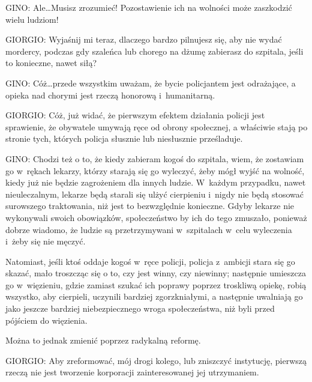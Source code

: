 \documentclass[oneside,polish,11pt,sfheadings]{mwbk}
\begin{document}
 
\noindent \noindent GINO: Ale\ldots Musisz zrozumieć! Pozostawienie ich na wolności może zaszkodzić wielu ludziom! 




 
\noindent GIORGIO: Wyjaśnij mi teraz, dlaczego bardzo pilnujesz się, aby nie wydać mordercy, podczas gdy szaleńca lub chorego na
dżumę zabierasz do szpitala, jeśli to konieczne, nawet siłą? 




 
\noindent \noindent GINO: Cóż\ldots przede wszystkim uważam, że bycie policjantem jest odrażające, a opieka nad chorymi jest rzeczą honorową i~humanitarną. 




 
\noindent GIORGIO: Cóż, już widać, że pierwszym efektem działania policji jest sprawienie, że obywatele umywają ręce od obrony
społecznej, a właściwie stają po stronie tych, których policja słusznie lub niesłusznie prześladuje. 




 
\noindent \noindent GINO: Chodzi też o to, że kiedy zabieram kogoś do szpitala, wiem, że zostawiam go w~rękach lekarzy, którzy starają się
go wyleczyć, żeby mógł wyjść na wolność, kiedy już nie będzie zagrożeniem dla innych ludzie. W~każdym przypadku, nawet
nieuleczalnym, lekarze będą starali się ulżyć cierpieniu i~nigdy nie będą stosować surowszego traktowania, niż jest to
bezwzględnie konieczne. Gdyby lekarze nie wykonywali swoich obowiązków, społeczeństwo by ich do tego zmuszało, ponieważ
dobrze wiadomo, że ludzie są przetrzymywani w~szpitalach w~celu wyleczenia i~żeby się nie męczyć. 

 
Natomiast, jeśli ktoś oddaje kogoś w~ręce policji, policja z~ambicji stara się go skazać, mało troszcząc się o to, czy
jest winny, czy niewinny; następnie umieszcza go w~więzieniu, gdzie zamiast szukać ich poprawy poprzez troskliwą
opiekę, robią wszystko, aby cierpieli, uczynili bardziej zgorzkniałymi, a następnie uwalniają go jako jeszcze bardziej
niebezpiecznego wroga społeczeństwa, niż byli przed pójściem do więzienia. 

 
Można to jednak zmienić poprzez radykalną reformę. 




 
\noindent GIORGIO: Aby zreformować, mój drogi kolego, lub zniszczyć instytucję, pierwszą rzeczą nie jest tworzenie korporacji
zainteresowanej jej utrzymaniem. 
\end{document}
